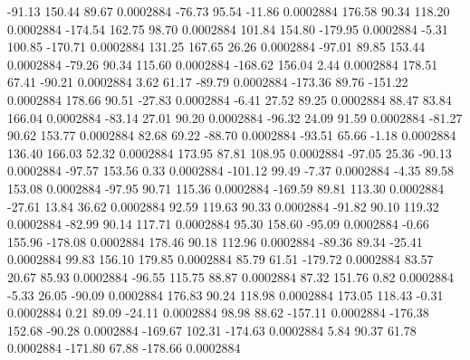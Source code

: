       -91.13      150.44       89.67     0.0002884
      -76.73       95.54      -11.86     0.0002884
      176.58       90.34      118.20     0.0002884
     -174.54      162.75       98.70     0.0002884
      101.84      154.80     -179.95     0.0002884
       -5.31      100.85     -170.71     0.0002884
      131.25      167.65       26.26     0.0002884
      -97.01       89.85      153.44     0.0002884
      -79.26       90.34      115.60     0.0002884
     -168.62      156.04        2.44     0.0002884
      178.51       67.41      -90.21     0.0002884
        3.62       61.17      -89.79     0.0002884
     -173.36       89.76     -151.22     0.0002884
      178.66       90.51      -27.83     0.0002884
       -6.41       27.52       89.25     0.0002884
       88.47       83.84      166.04     0.0002884
      -83.14       27.01       90.20     0.0002884
      -96.32       24.09       91.59     0.0002884
      -81.27       90.62      153.77     0.0002884
       82.68       69.22      -88.70     0.0002884
      -93.51       65.66       -1.18     0.0002884
      136.40      166.03       52.32     0.0002884
      173.95       87.81      108.95     0.0002884
      -97.05       25.36      -90.13     0.0002884
      -97.57      153.56        0.33     0.0002884
     -101.12       99.49       -7.37     0.0002884
       -4.35       89.58      153.08     0.0002884
      -97.95       90.71      115.36     0.0002884
     -169.59       89.81      113.30     0.0002884
      -27.61       13.84       36.62     0.0002884
       92.59      119.63       90.33     0.0002884
      -91.82       90.10      119.32     0.0002884
      -82.99       90.14      117.71     0.0002884
       95.30      158.60      -95.09     0.0002884
       -0.66      155.96     -178.08     0.0002884
      178.46       90.18      112.96     0.0002884
      -89.36       89.34      -25.41     0.0002884
       99.83      156.10      179.85     0.0002884
       85.79       61.51     -179.72     0.0002884
       83.57       20.67       85.93     0.0002884
      -96.55      115.75       88.87     0.0002884
       87.32      151.76        0.82     0.0002884
       -5.33       26.05      -90.09     0.0002884
      176.83       90.24      118.98     0.0002884
      173.05      118.43       -0.31     0.0002884
        0.21       89.09      -24.11     0.0002884
       98.98       88.62     -157.11     0.0002884
     -176.38      152.68      -90.28     0.0002884
     -169.67      102.31     -174.63     0.0002884
        5.84       90.37       61.78     0.0002884
     -171.80       67.88     -178.66     0.0002884
